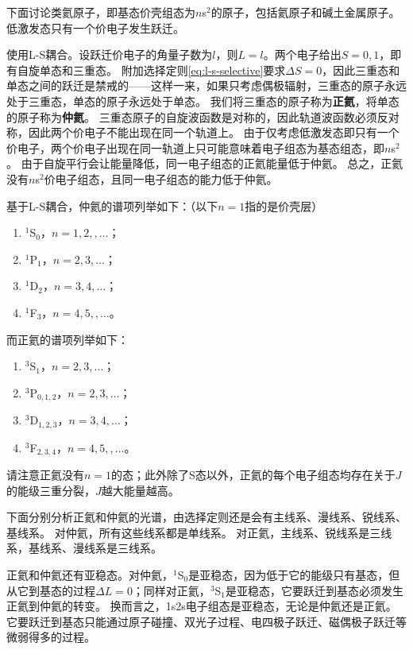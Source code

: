 \documentclass[UTF8, a4paper]{ctexart}
\newcommand*{\lsterm}[3]{$^{#1}${#2}$_{#3}$}
\begin{document}
下面讨论类氦原子，即基态价壳组态为$n$s$^2$的原子，包括氦原子和碱土金属原子。
低激发态只有一个价电子发生跃迁。

使用L-S耦合。设跃迁价电子的角量子数为$l$，则$L=l$。两个电子给出$S=0, 1$，即有自旋单态和三重态。
附加选择定则\eqref{eq:l-s-selective}要求$\Delta S=0$，因此三重态和单态之间的跃迁是禁戒的——这样一来，如果只考虑偶极辐射，三重态的原子永远处于三重态，单态的原子永远处于单态。
我们将三重态的原子称为\textbf{正氦}，将单态的原子称为\textbf{仲氦}。
三重态原子的自旋波函数是对称的，因此轨道波函数必须反对称，因此两个价电子不能出现在同一个轨道上。
由于仅考虑低激发态即只有一个价电子，两个价电子出现在同一轨道上只可能意味着电子组态为基态组态，即$n$s$^2$。
由于自旋平行会让能量降低，同一电子组态的正氦能量低于仲氦。
总之，正氦没有$n$s$^2$价电子组态，且同一电子组态的能力低于仲氦。

基于L-S耦合，仲氦的谱项列举如下：（以下$n=1$指的是价壳层）
\begin{enumerate}
    \item \lsterm{1}{S}{0}，$n=1, 2, ,\ldots$；
    \item \lsterm{1}{P}{1}，$n=2, 3, \ldots$；
    \item \lsterm{1}{D}{2}，$n=3, 4, \ldots$；
    \item \lsterm{1}{F}{3}，$n=4, 5, ,\ldots$。
\end{enumerate}
而正氦的谱项列举如下：
\begin{enumerate}
    \item \lsterm{3}{S}{1}，$n=2, 3,\ldots$；
    \item \lsterm{3}{P}{0,1,2}，$n=2, 3, \ldots$；
    \item \lsterm{3}{D}{1,2,3}，$n=3, 4, \ldots$；
    \item \lsterm{3}{F}{2,3,4}，$n=4, 5, ,\ldots$。
\end{enumerate}
请注意正氦没有$n=1$的态；此外除了S态以外，正氦的每个电子组态均存在关于$J$的能级三重分裂，$J$越大能量越高。

下面分别分析正氦和仲氦的光谱，由选择定则还是会有主线系、漫线系、锐线系、基线系。
对仲氦，所有这些线系都是单线系。
对正氦，主线系、锐线系是三线系，基线系、漫线系是三线系。

正氦和仲氦还有亚稳态。对仲氦，\lsterm{1}{S}{0}是亚稳态，因为低于它的能级只有基态，但从它到基态的过程$\Delta L = 0$；同样对正氦，\lsterm{3}{S}{1}是亚稳态，它要跃迁到基态必须发生正氦到仲氦的转变。
换而言之，1s2s电子组态是亚稳态，无论是仲氦还是正氦。它要跃迁到基态只能通过原子碰撞、双光子过程、电四极子跃迁、磁偶极子跃迁等微弱得多的过程。
\end{document}
